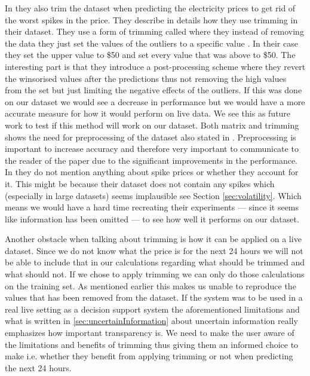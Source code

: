 In \cite{singhal2011electricity, yamin2004adaptive} they also trim the dataset when predicting the electricity prices to get rid of the worst spikes in the price. They describe in details how they use trimming in their dataset. They use a form of trimming called  where they instead of removing the data they just set the values of the outliers to a specific value \cite{yamin2004adaptive}. In their case they set the upper value to \$50 and set every value that was above to \$50. The interesting part is that they introduce a post-processing scheme where they revert the winsorised values after the predictions thus not removing the high values from the set but just limiting the negative effects of the outliers. If this was done on our dataset we would see a decrease in performance\cite{yamin2004adaptive} but we would have a more accurate measure for how it would perform on live data. We see this as future work to test if this method will work on our dataset. Both matrix and trimming shows the need for preprocessing of the dataset also stated in \cite{yamin2004adaptive}. Preprocessing is important to increase accuracy and therefore very important to communicate to the reader of the paper due to the significant improvements in the performance. In \cite{sansom1999neural, 1} they do not mention anything about spike prices or whether they account for it. This might be because their dataset does not contain any spikes which (especially in large datasets) seems implausible see Section \ref{sec:volatility}. Which means we would have a hard time recreating their experiments --- since it seems like information has been omitted --- to see how well it performs on our dataset.

Another obstacle when talking about trimming is how it can be applied on a live dataset. Since we do not know what the price is for the next 24 hours we will not be able to include that in our calculations regarding what should be trimmed and what should not. If we chose to apply trimming we can only do those calculations on the training set. As mentioned earlier this makes us unable to reproduce the values that has been removed from the dataset. If the system was to be used in a real live setting as a decision support system the aforementioned limitations and what is written in \ref{sec:uncertainInformation} about uncertain information really emphasizes how important transparency is. We need to make the user aware of the limitations and benefits of trimming thus giving them an informed choice to make i.e. whether they benefit from applying trimming or not when predicting the next 24 hours.